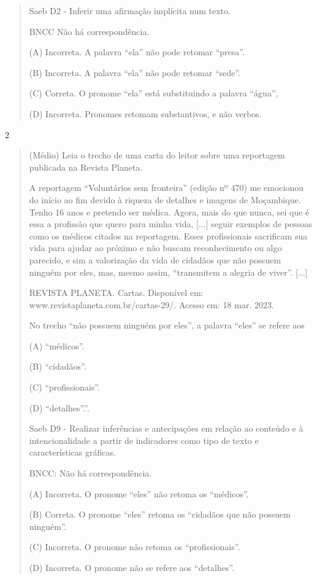 \begin{escolha}
\begin{escolha}
{\begin{quote}
Saeb D2 - Inferir uma afirmação implícita num texto.

BNCC Não há correspondência.

(A) Incorreta. A palavra ``ela'' não pode retomar ``presa''.

(B) Incorreta. A palavra ``ela'' não pode retomar ``sede''.

(C) Correta. O pronome ``ela'' está substituindo a palavra ``água'',

(D) Incorreta. Pronomes retomam substantivos, e não verbos.
\end{quote}

\num{2}

\begin{quote}
(Médio) Leia o trecho de uma carta do leitor sobre uma reportagem
publicada na Revista Planeta.

A reportagem ``Voluntários sem fronteira'' (edição nº 470) me emocionou
do início ao fim devido à riqueza de detalhes e imagens de Moçambique.
Tenho 16 anos e pretendo ser médica. Agora, mais do que nunca, sei que é
essa a profissão que quero para minha vida, {[}...{]} seguir exemplos de
pessoas como os médicos citados na reportagem. Esses profissionais
sacrificam sua vida para ajudar ao próximo e não buscam reconhecimento
ou algo parecido, e sim a valorização da vida de cidadãos que não
possuem ninguém por eles, mas, mesmo assim, ``transmitem a alegria de
viver''. {[}...{]}

REVISTA PLANETA. Cartas. Disponível em:
www.revistaplaneta.com.br/cartas-29/. Acesso em: 18 mar. 2023.

No trecho ``não possuem ninguém por eles'', a palavra ``eles'' se refere
aos

(A) ``médicos''.

(B) ``cidadãos''.

(C) ``profissionais''.

(D) ``detalhes''.''.

Saeb D9 - Realizar inferências e antecipações em relação ao conteúdo e à
intencionalidade a partir de indicadores como tipo de texto e
características gráficas.

BNCC: Não há correspondência.

(A) Incorreta. O pronome ``eles'' não retoma os ``médicos''.

(B) Correta. O pronome ``eles'' retoma os ``cidadãos que não possuem
ninguém''.

(C) Incorreta. O pronome não retoma os ``profissionais''.

(D) Incorreta. O pronome não se refere aos ``detalhes''.
\end{quote}

}
\end{escolha}
\end{escolha}
